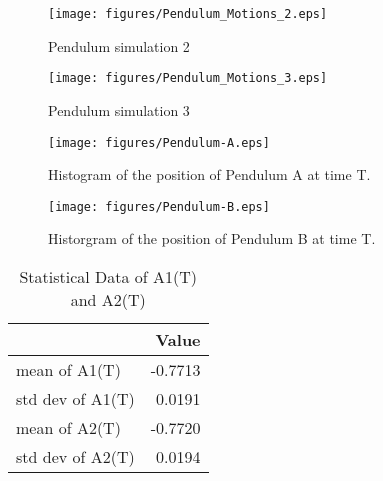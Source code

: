 \documentclass{article}
\begin{document}
\begin{figure}[H]
\centering
\texttt{[image: figures/Pendulum\_Motions\_2.eps]}
\caption{Pendulum simulation 2}
\label{fig:q1-pend-sim-2}
\end{figure}

\begin{figure}[H]
\centering
\texttt{[image: figures/Pendulum\_Motions\_3.eps]}
\caption{Pendulum simulation 3}
\label{fig:q1-pend-sim-3}
\end{figure}


\begin{figure}[H]
  \centering
  \texttt{[image: figures/Pendulum-A.eps]}
  \caption{Histogram of the position of Pendulum A at time T.}
  \label{fig:figures-Pendulum-A-eps}
\end{figure}

\begin{figure}[H]
  \centering
  \texttt{[image: figures/Pendulum-B.eps]}
  \caption{Historgram of the position of Pendulum B at time T.}
  \label{fig:figures-Pendulum-B-eps}
\end{figure}


\begin{table}[H]
\centering
\caption{Statistical Data of A1(T) and A2(T)}
\begin{tabular}{|l|r|}
\hline
\textbf{}       & \textbf{Value} \\
\hline
mean of A1(T)   & -0.7713        \\
std dev of A1(T) & 0.0191         \\
mean of A2(T)   & -0.7720        \\
std dev of A2(T) & 0.0194         \\
\hline
\end{tabular}
\end{table}
\end{document}
